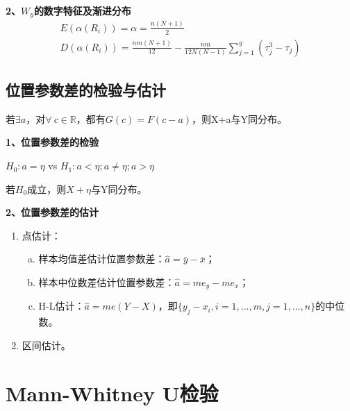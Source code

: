 \documentclass[lang=cn,10pt]{elegantbook}
\begin{document}
\textbf{2、$W_y$的数字特征及渐进分布}
\begin{equation}
    \begin{gathered}
        E(\alpha(R_i))=\alpha=\frac{n(N+1)}{2} \\
        D(\alpha(R_i))=\frac{nm(N+1)}{12}-\frac{nm}{12N(N-1)}\sum_{j=1}^{g}(\tau_j^3-\tau_j)
    \end{gathered}
\end{equation}

\subsection{位置参数差的检验与估计}
若$\exists a$，对$\forall ~ c \in \mathbb{R}$，都有$G(c) = F(c-a)$，则X+a与Y同分布。

\textbf{1、位置参数差的检验}
\begin{center}
    $H_0:a = \eta $ vs $H_1:a < \eta; a \neq \eta; a > \eta$
\end{center}
若$H_0$成立，则$X+\eta$与Y同分布。

\textbf{2、位置参数差的估计}
\begin{enumerate}[(1)]
    \item 点估计：
          \begin{enumerate}[(a)]
              \item 样本均值差估计位置参数差：$\hat{a} = \bar{y}-\bar{x}$；
              \item 样本中位数差估计位置参数差：$\hat{a} = me_{y}-me_{x}$；
              \item H-L估计：$\hat{a} = me(Y-X)$，即$\{y_j - x_i,i = 1,...,m,j = 1,...,n\}$的中位数。
          \end{enumerate}
    \item 区间估计。
\end{enumerate}

\section{Mann-Whitney U检验}
\end{document}
